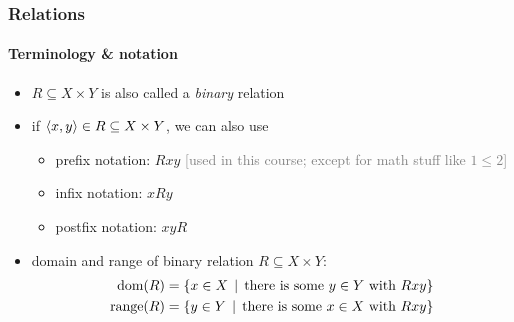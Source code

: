 \documentclass[fleqn,10pt,serif,xcolor=svgnames,xcolor=table,aspectratio=169]{beamer}
\newcommand{\mygray}[1]{\textcolor{gray}{#1}}
\begin{document}
\begin{frame}
  \frametitle{Relations}
  \framesubtitle{Terminology \& notation}

  \begin{itemize}
    \item $R \subseteq X \times Y$ is also called a \textit{binary} relation
    \item if $\left \langle x,y\right\rangle \in R \subseteq X \times Y$, we can also use
    \begin{itemize}
      \item \textcolor{themecolor}{prefix notation:} $Rxy$ \hfill \mygray{[used in this course; except for math stuff like $1\le2$]}
      \item \textcolor{themecolor}{infix notation:} $xRy$
      \item \textcolor{themecolor}{postfix notation:} $xyR$
    \end{itemize}
    \item domain and range of binary relation $R \subseteq X \times Y$:
          \begin{align*}
            \text{dom}(R) & = \left\{x \in X \thinspace \mid \thinspace \text{there is some $y \in Y$ with } Rxy\right\} \\
            \text{range}(R) & = \left\{y \in Y \thinspace \mid \thinspace \text{there is some $x \in X$ with } Rxy\right\}
          \end{align*}
  \end{itemize}

\end{frame}
\end{document}
